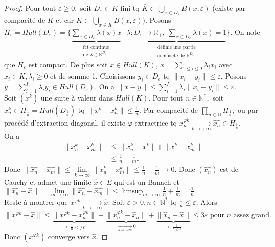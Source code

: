 \begin{proof}
    Pour tout $\varepsilon \ge 0,$ soit $D_\varepsilon \subset K$ fini tq $\overline{K}\subset \bigcup\limits_{x\in D_\varepsilon } B(x,\varepsilon )$ (existe par compacité de $\overline{K}$ et car $\overline{K}\subset \bigcup\limits_{x\in K} B(x,\varepsilon )$). Posons $H_\varepsilon =Hull(D_\varepsilon )=\{\underbrace{\sum\limits_{x\in D_\varepsilon }^{} \lambda(x)x}_{\substack{\text{fct continue}\\\text{de }\lambda\in \mathbb{R} ^{D_\varepsilon }}}\ |\ \underbrace{\lambda:D_\varepsilon \to \mathbb{R} _+,\ \sum\limits_{x\in D_\varepsilon }^{} \lambda(x)=1}_{\substack{\text{définie une partie}\\\text{compacte de }\mathbb{R} ^{D_\varepsilon }}}\} $. On note que $H_\varepsilon $ est compact. De plus soit $x\in Hull(K)$, $x=\sum\limits_{1\le i\le I}^{} \lambda_ix_i$ avec $x_i\in K, \lambda_i\ge 0$ et de somme 1. Choisissons $y_i\in D_\varepsilon $ tq $\|x_i-y_i\|\le \varepsilon .$ Posons $y=\sum\limits_{i=1}^{I} \lambda_iy_i\in Hull(D_\varepsilon ).$ On a $\|x-y\|\le \sum\limits_{i=1}^{I} \lambda_i\|x_i-y_i\|\le \varepsilon .$ \\
    Soit $(x^k)$ une suite à valeur dans $Hull(K).$ Pour tout $n\in \mathbb{N} ^*,$ soit $x_n^k\in H_{\frac{1}{n}}=Hull(D_{\frac{1}{n}})$ tq $\|x^k-x^k_n\|\le \frac{1}{n}.$ Par compacité de $\prod\limits_{n\in \mathbb{N} }^{} H_{\frac{1}{n}},$ ou par procédé d'extraction diagonal, il existe $\varphi $ extractrice tq $x_n^{\varphi k}\underset{k\to +\infty}{\longrightarrow} \hat{x_n}\in H_{\frac{1}{n}}.$ \\
    On a
    \begin{align*}
        \|x_n^k-x_m^k\|&\le \|x_n^k-x^k\|+\|x^k-x_m^k\|\\
                       &\le \frac{1}{n}+\frac{1}{m}.
    \end{align*}
    Donc $\|\hat{x_n}-\hat{x_m}\|\le \lim\limits_{k \to \infty} \|x_n^k-x_m^k\|\le \frac{1}{n}+\frac{1}{m} \to 0$. Donc $(\hat{x_n})$ est de Cauchy et admet une limite $\hat{x}\in E$ qui est un Banach et $\|\hat{x_n}-\hat{x}\|=\lim\limits_{m \to \infty} \|\hat{x_n}-\hat{x_m}\|\le \limsup_{m\to \infty }\frac{1}{n}+\frac{1}{m}=\frac{1}{n}.$\\
    Reste à montrer que $x^{\varphi k}\underset{k\to +\infty}{\longrightarrow} \hat{x}.$ Soit $\varepsilon >0, n\in \mathbb{N} ^*$ tq $\frac{1}{n}\le \varepsilon .$ Alors $\|x^{\varphi k}-\hat{x}\|\le \underbrace{\|x^{\varphi k}-x^{\varphi k}_n\|}_{\le \frac{1}{n}</\varepsilon } + \underbrace{\|x^{\varphi k}_n-\hat{x}_n\|}_{\underset{k\to +\infty}{\longrightarrow} 0} + \underbrace{\|\hat{x}_n-\hat{x}\|}_{\le \frac{1}{n\le \varepsilon }}\le 3\varepsilon \text{ pour $n$ assez grand.}$
    Donc $(x^{\varphi k})$ converge vers $\hat{x}.$
\end{proof}
